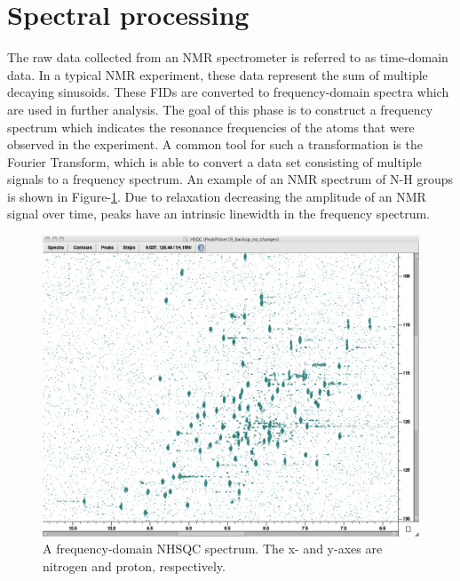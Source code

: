 \section{Spectral processing}

The raw data collected from an NMR spectrometer is referred to as 
time-domain data.  In a typical NMR experiment, these data represent the 
sum of multiple decaying sinusoids.  These FIDs are converted to 
frequency-domain spectra which are used in further analysis.  The goal of 
this phase is to construct a frequency spectrum which indicates the resonance 
frequencies of the atoms that were observed in the experiment.  A common tool 
for such a transformation is the Fourier Transform, which is able to convert 
a data set consisting of multiple signals to a frequency spectrum.  
An example of an NMR spectrum of N-H groups is shown in Figure-\ref{nhsqc}.
Due to relaxation decreasing the amplitude of an NMR signal over time, peaks 
have an intrinsic linewidth in the frequency spectrum.

\begin{figure}
  \includegraphics[scale=0.35]{figures/nhsqc}
  \caption[A frequency-domain NHSQC spectrum]
          {A frequency-domain NHSQC spectrum. 
           The x- and y-axes are nitrogen and proton, respectively.}
  \label{nhsqc}
\end{figure}

